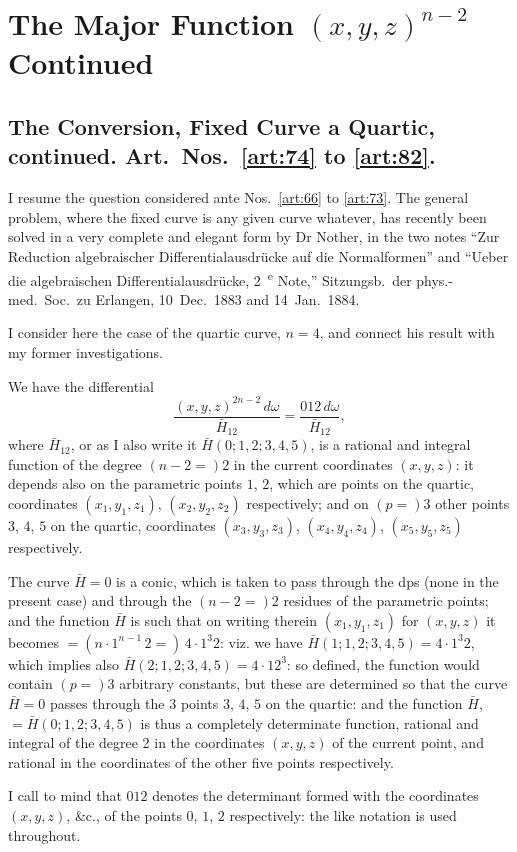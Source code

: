\documentclass[11pt,a4paper]{book}
\begin{document}
\newpage
\section*{The Major Function $(x, y, z)^{n-2}$ Continued}

\subsection*{The Conversion, Fixed Curve a Quartic, continued. Art.~Nos.~\ref{art:74} to \ref{art:82}.}

\begin{art}\label{art:74}
I resume the question considered ante Nos.~\ref{art:66} to \ref{art:73}. The general problem, where the fixed curve is any given curve whatever, has recently been solved in a very complete and elegant form by Dr Nother, in the two notes ``Zur Reduction algebraischer Differentialausdr\"ucke auf die Normalformen'' and ``Ueber die algebraischen Differentialausdr\"ucke, 2~\textsuperscript{e} Note,'' Sitzungsb.\ der phys.-med.\ Soc.\ zu Erlangen, 10~Dec.\ 1883 and 14~Jan.\ 1884.

I consider here the case of the quartic curve, $n = 4$, and connect his result with my former investigations.

We have the differential
\[
\frac{(x, y, z)^{2n-2}\,d\omega}{\bar{H}_{12}} = \frac{012\,d\omega}{\bar{H}_{12}},
\]
where $\bar{H}_{12}$, or as I also write it $\bar{H}(0; 1, 2; 3, 4, 5)$, is a rational and integral function of the degree $(n - 2 =) 2$ in the current coordinates $(x, y, z)$: it depends also on the parametric points $1$, $2$, which are points on the quartic, coordinates $(x_1, y_1, z_1)$, $(x_2, y_2, z_2)$ respectively; and on $(p =) 3$ other points $3$, $4$, $5$ on the quartic, coordinates $(x_3, y_3, z_3)$, $(x_4, y_4, z_4)$, $(x_5, y_5, z_5)$ respectively.

The curve $\bar{H} = 0$ is a conic, which is taken to pass through the dps (none in the present case) and through the $(n - 2 =) 2$ residues of the parametric points; and the function $\bar{H}$ is such that on writing therein $(x_1, y_1, z_1)$ for $(x, y, z)$ it becomes $= (n \cdot 1^{n-1}\,2 =)\, 4 \cdot 1^3 2$: viz. we have $\bar{H}(1; 1, 2; 3, 4, 5) = 4 \cdot 1^3 2$, which implies also $\bar{H}(2; 1, 2; 3, 4, 5) = 4 \cdot 12^3$: so defined, the function would contain $(p =) 3$ arbitrary constants, but these are determined so that the curve $\bar{H} = 0$ passes through the 3 points $3$, $4$, $5$ on the quartic: and the function $\bar{H}$, $= \bar{H}(0; 1, 2; 3, 4, 5)$ is thus a completely determinate function, rational and integral of the degree 2 in the coordinates $(x, y, z)$ of the current point, and rational in the coordinates of the other five points respectively.

I call to mind that $012$ denotes the determinant formed with the coordinates $(x, y, z)$, \&c., of the points $0$, $1$, $2$ respectively: the like notation is used throughout.
\end{art}
\end{document}
